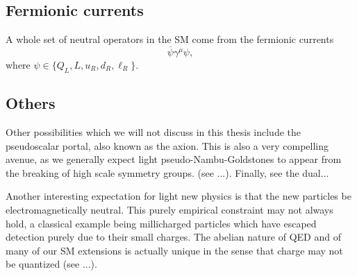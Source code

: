 \subsection{Fermionic currents}

A whole set of neutral operators in the SM come from the fermionic currents
\begin{equation}
 \overline{\psi} \gamma^\mu \psi,
\end{equation}
where $\psi \in \{Q_L, L, u_R, d_R, \ell_R\}$.


\subsection{Others}

Other possibilities which we will not discuss in this thesis include the pseudoscalar portal, also known as the axion. This is also a very compelling avenue, as we generally expect light pseudo-Nambu-Goldstones to appear from the breaking of high scale symmetry groups. (see ...). Finally, see the dual...

Another interesting expectation for light new physics is that the new particles be electromagnetically neutral. This purely empirical constraint may not always hold, a classical example being millicharged particles which have escaped detection purely due to their small charges. The abelian nature of QED and of many of our SM extensions is actually unique in the sense that charge may not be quantized (see \eg ...).